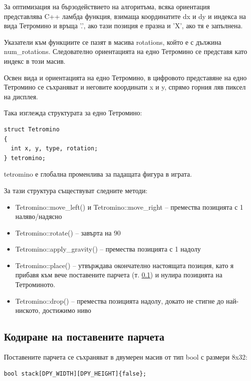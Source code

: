 \documentclass[titlepage, oneside, 14pt]{extbook}
\renewcommand{\texttt}[1]{{\small\ttfamily #1}}
\begin{document}
За оптимизация на бързодействието на алгоритъма, всяка ориентация представлява C++ ламбда функция, взимаща
координатите \texttt{dx} и \texttt{dy} и индекса на вида Тетромино и връща \texttt{'.'}, ако тази позиция е празна
и \texttt{'X'}, ако тя е запълнена.

Указатели към функциите се пазят в масива \texttt{rotations}, който е с дължина \texttt{num_rotations}. Следователно
ориентацията на едно Тетромино се представя като индекс в този масив.

Освен вида и ориентацията на едно Тетромино, в цифровото представяне на едно Тетромино се съхраняват и неговите
координати \texttt{x} и \texttt{y}, спрямо горния ляв пиксел на дисплея.

Така изглежда структурата за едно Тетромино:

\begin{verbatim}
struct Tetromino
{
  int x, y, type, rotation;
} tetromino;
\end{verbatim}

\texttt{tetromino} е глобална променлива за падащата фигура в играта.

За тази структура съществуват следните методи:

\begin{itemize}
  \item \texttt{Tetromino::move_left()} и \texttt{Tetromino::move_right} -- премества позицията с 1 наляво/надясно
  \item \texttt{Tetromino::rotate()} -- завърта на 90\textdegree{}
  \item \texttt{Tetromino::apply_gravity()} -- премества позицията с 1 надолу
  \item \texttt{Tetromino::place()} -- утвърждава окончателно настоящата
    позиция, като я прибавя към вече поставените парчета (т. \ref{stack}) и нулира позицията на Тетроминото.
  \item \texttt{Tetromino::drop()} -- премества позицията надолу, докато не стигне до най-ниското, достижимо ниво
\end{itemize}

\subsection{Кодиране на поставените парчета}
\label{stack}

Поставените парчета се съхраняват в двумерен масив от тип \texttt{bool} с размери 8x32:

\begin{verbatim}
bool stack[DPY_WIDTH][DPY_HEIGHT]{false};
\end{verbatim}
\end{document}
